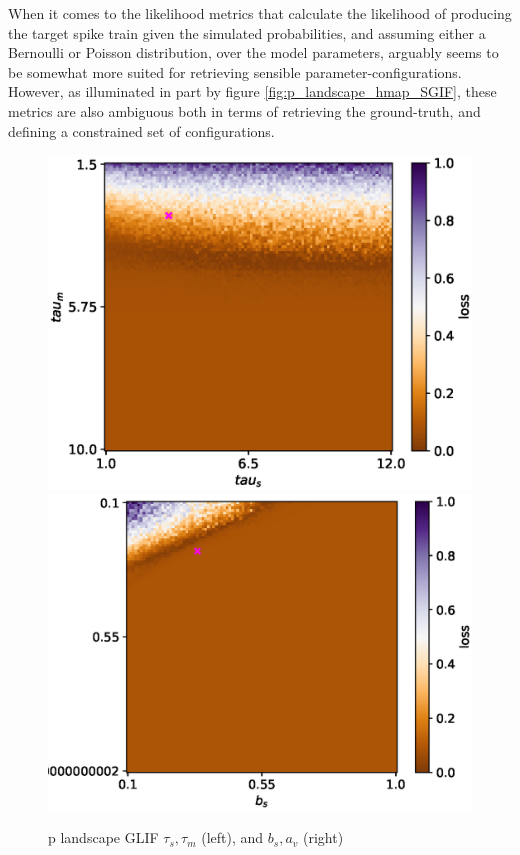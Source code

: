 \documentclass[mphil,deptreport,ianc]{infthesis} %
\begin{document}
When it comes to the likelihood metrics that calculate the likelihood of producing the target spike train given the simulated probabilities, and assuming either a Bernoulli or Poisson distribution, over the model parameters, arguably seems to be somewhat more suited for retrieving sensible parameter-configurations.
However, as illuminated in part by figure \ref{fig:p_landscape_hmap_SGIF}, these metrics are also ambiguous both in terms of retrieving the ground-truth, and defining a constrained set of configurations.


\begin{figure}
    \centering
    \vskip -0.1in
    \includegraphics[width=0.49\columnwidth]{figures/param_landscape_heatmaps/GLIF/test_export_2d_heatmap_N_4_loss_tau_s_tau_m.eps}
    \includegraphics[width=0.49\columnwidth]{figures/param_landscape_heatmaps/GLIF/test_export_2d_heatmap_N_4_loss_b_s_a_v.eps}
    \vskip -0.1in
    \caption{p landscape GLIF $\tau_s, \tau_m$ (left), and $b_s, a_v$ (right)}
    \label{fig:p_landscape_hmap_GLIF}
\end{figure}
\end{document}
